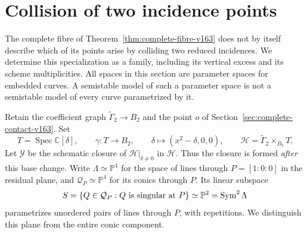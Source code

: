 \documentclass[11pt,reqno]{amsart}
\numberwithin{equation}{section}
\theoremstyle{definition}\newtheorem{definition}[theorem]{Definition}
\theoremstyle{remark}\newtheorem{remark}[theorem]{Remark}
\newcommand{\C}{\mathbb C}\newcommand{\Q}{\mathbb Q}
\newcommand{\Pj}{\mathbb P}\newcommand{\A}{\mathbb A}
\DeclareMathOperator{\Spec}{Spec}\DeclareMathOperator{\PGL}{PGL}
\begin{document}
\section{Collision of two incidence points}
\label{sec:collision-family-v164}
The complete fibre of Theorem~\ref{thm:complete-fibre-v163} does not
by itself describe which of its points arise by colliding two reduced
incidences. We determine this specialization as a family, including
its vertical excess and its scheme multiplicities. All spaces in this
section are parameter spaces for embedded curves. A semistable model
of such a parameter space is not a semistable model of every curve
parametrized by it.

Retain the coefficient graph $\widetilde\Gamma_2\to B_2$ and the
point $o$ of Section~\ref{sec:complete-contact-v163}. Set
\begin{equation}\label{eq:collision-base-v164}
 T=\Spec\C[\delta],\qquad
 \gamma:T\longrightarrow B_2,\qquad
 \delta\longmapsto(x^2-\delta,0,0),\qquad
 \mathcal H=\widetilde\Gamma_2\times_{B_2}T.
\end{equation}
Let $\mathcal Y$ be the schematic closure of
$\mathcal H|_{\delta\ne0}$ in $\mathcal H$. Thus the closure is
formed \emph{after} this base change. Write $\Lambda\simeq\Pj^1$
for the space of lines through $P=[1:0:0]$ in the residual plane,
and $\mathcal Q_P\simeq\Pj^4$ for its conics through $P$.
Its linear subspace
\[
 S=\{Q\in\mathcal Q_P:Q\hbox{ is singular at }P\}\simeq\Pj^2
       =\operatorname{Sym}^2\Lambda
\]
parametrizes unordered pairs of lines through $P$, with repetitions.
We distinguish this plane from the entire conic component.
\end{document}
